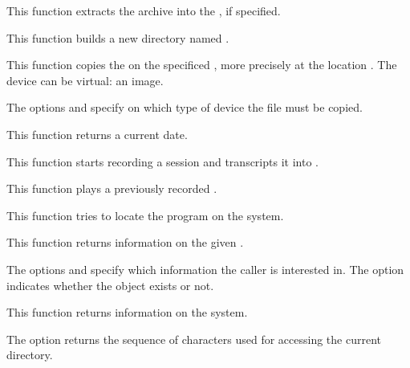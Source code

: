          {
	   This function extracts the archive  into the
	   , if specified.
	 }

         {
	   This function builds a new directory named .
	 }

         {
	   This function copies the  on the specificed
	   , more precisely at the location .
	   The device can be virtual: an image.

	   \-

	   The options  and 
	   specify on which type of device the file must be copied.
	 }

         {
	   This function returns a current date.
	 }

         {
	   This function starts recording a session and transcripts it
           into .
	 }

         {
	   This function plays a previously recorded .
	 }

         {
	   This function tries to locate the program 
	   on the system.
	 }

         {
	   This function returns information on the given .

	   \-

	   The options  and 
	   specify which information the caller is interested in. The option
            indicates whether the  object
           exists or not.
	 }

         {
	   This function returns information on the system.

	   \-

	   The option  returns the
           sequence of characters used for accessing the current directory.
	 }
